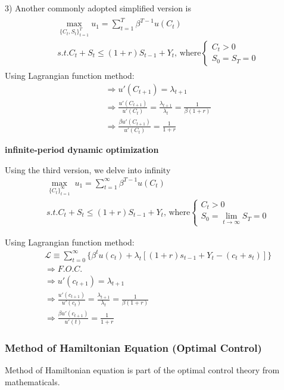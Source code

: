 \documentclass{article}
\begin{document}
3) Another commonly adopted simplified version is
\begin{align}
\begin{split}
&\mathop{max}\limits_{\{C_{t},S_{t}\}_{t=1}^{T}} u_{1}=\sum\limits_{t=1}^{T}\beta^{T-1}u(C_{t})
\\&s.t. C_{t}+S_{t}\leqslant (1+r)S_{t-1}+Y_{t} \text{, where} \begin{cases}
C_{t}>0 \\
S_{0}=S_{T}=0
\end{cases}
\end{split}
\end{align}
Using Lagrangian function method:
\begin{align}
&\Rightarrow u'(C_{t+1})=\lambda_{t+1}
\\&\Rightarrow \frac{u'(C_{t+1})}{u'(C_{t})}=\frac{\lambda_{t+1}}{\lambda_{t}}=\frac{1}{\beta(1+r)}
\\&\Rightarrow \frac{\beta u'(C_{t+1})}{u'(C_t)}=\frac{1}{1+r}
\end{align}

\textbf{infinite-period dynamic optimization} 

Using the third version, we delve into infinity
\begin{equation}
\begin{split}
&\mathop{max}_{\{C_{t}\}_{t=1}^{\infty}}\; u_{1}=\sum\limits_{t=1}^{\infty}\beta^{T-1}u(C_{t})
\\&s.t. C_{t}+S_{t}\leqslant (1+r)S_{t-1}+Y_{t} \text{, where} 
\begin{cases}
C_{t}>0 \\
S_{0}=\lim\limits_{t \rightarrow \infty} S_{T}=0
\end{cases}
\end{split}
\end{equation}


Using Lagrangian function method:
\begin{align}
& \mathscr{L} \equiv \sum\limits_{t=0}^{\infty} \{\beta^{t}u(c_{t})+\lambda_{t}[(1+r)s_{t-1}+Y_{t}-(c_{t}+s_{t})]\}
\\&\Rightarrow F.O.C.
\\&\Rightarrow u'(c_{t+1})=\lambda_{t+1}
\\&\Rightarrow \frac{u'(c_{t+1})}{u'(c_{t})}=\frac{\lambda_{t+1}}{\lambda_{t}}=\frac{1}{\beta(1+r)}
\\&\Rightarrow \frac{\beta u'(c_{t+1})}{u'(t)}=\frac{1}{1+r}
\end{align}

\subsubsection{Method of Hamiltonian Equation (Optimal
Control)}\label{method-of-hamiltonian-equation-optimal-control}
Method of Hamiltonian equation is part of the optimal control theory from mathematicals.
\end{document}
